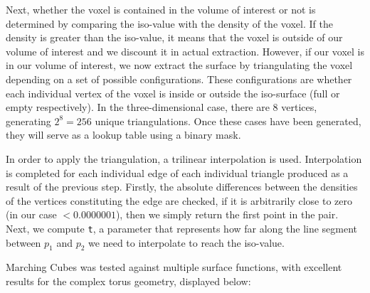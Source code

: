 \documentclass[10pt,a4paper]{article}
\begin{document}
Next, whether the voxel is contained in the volume of interest or not is determined by comparing the iso-value with the density of the voxel. If the density is greater than the iso-value, it means that the voxel is outside of our volume of interest and we discount it in actual extraction. However, if our voxel is in our volume of interest, we now extract the surface by triangulating the voxel depending on a set of possible configurations. These configurations are whether each individual vertex of the voxel is inside or outside the iso-surface (full or empty respectively). In the three-dimensional case, there are 8 vertices,  generating $2^8= 256$ unique triangulations. Once these cases have been generated, they will serve as a lookup table using a binary mask.

In order to apply the triangulation, a trilinear interpolation is used. Interpolation is completed for each individual edge of each individual triangle produced as a result of the previous step. Firstly, the absolute differences between the densities of the vertices constituting the edge are checked, if it is arbitrarily close to zero (in our case $<0.0000001$), then we simply return the first point in the pair. Next, we compute \texttt{t}, a parameter that represents how far along the line segment between $p_{1}$ and $p_{2}$ we need to interpolate to reach the iso-value.

Marching Cubes was tested against multiple surface functions, with excellent results for the complex torus geometry, displayed below:
\end{document}
